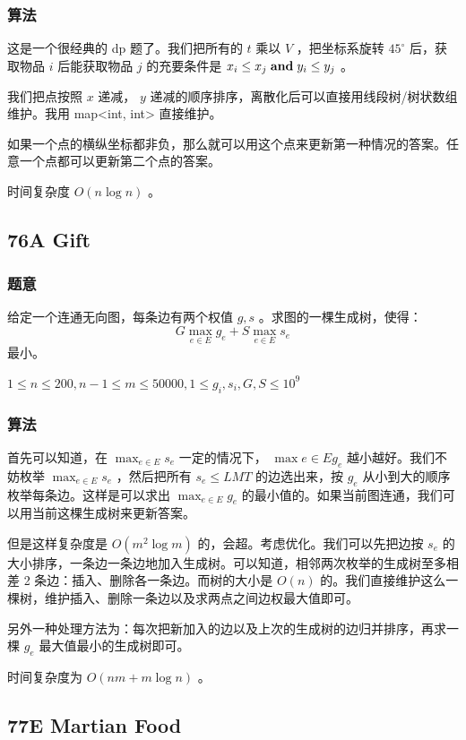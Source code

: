 \documentclass[11pt]{article}
\begin{document}
\subsubsection{算法}
\label{sec-5-7-2}

    这是一个很经典的 dp 题了。我们把所有的 $t$ 乘以 $V$ ，把坐标系旋转 $45^\circ$ 后，获取物品 $i$ 后能获取物品 $j$ 的充要条件是 $x_i \leq x_j \hspace{0.1cm} \textbf{and} \hspace{0.1cm} y_i \leq y_j$ 。

    我们把点按照 $x$ 递减， $y$ 递减的顺序排序，离散化后可以直接用线段树/树状数组维护。我用 map<int, int> 直接维护。

    如果一个点的横纵坐标都非负，那么就可以用这个点来更新第一种情况的答案。任意一个点都可以更新第二个点的答案。

    时间复杂度 $O(n \log n)$ 。
\subsection{76A   Gift}
\label{sec-5-8}
\subsubsection{题意}
\label{sec-5-8-1}

    给定一个连通无向图，每条边有两个权值 $g, s$ 。求图的一棵生成树，使得：
    $$G \max_{e \in E} g_e + S \max_{e \in E} s_e$$
    最小。

    $1 \leq n \leq 200, n - 1 \leq m \leq 50000, 1 \leq g_i, s_i, G, S \leq 10^9$
\subsubsection{算法}
\label{sec-5-8-2}

    首先可以知道，在 $\max_{e \in E} s_e$ 一定的情况下， $\max{e \in E} g_e$ 越小越好。我们不妨枚举 $\max_{e \in E} s_e$ ，然后把所有 $s_e \leq LMT$ 的边选出来，按 $g_e$ 从小到大的顺序枚举每条边。这样是可以求出 $\max_{e \in E} g_e$ 的最小值的。如果当前图连通，我们可以用当前这棵生成树来更新答案。

    但是这样复杂度是 $O(m^2 \log m)$ 的，会超。考虑优化。我们可以先把边按 $s_e$ 的大小排序，一条边一条边地加入生成树。可以知道，相邻两次枚举的生成树至多相差 2 条边：插入、删除各一条边。而树的大小是 $O(n)$ 的。我们直接维护这么一棵树，维护插入、删除一条边以及求两点之间边权最大值即可。

    另外一种处理方法为：每次把新加入的边以及上次的生成树的边归并排序，再求一棵 $g_e$ 最大值最小的生成树即可。

    时间复杂度为 $O(nm + m \log n)$ 。
\subsection{77E   Martian Food}
\label{sec-5-9}
\end{document}
